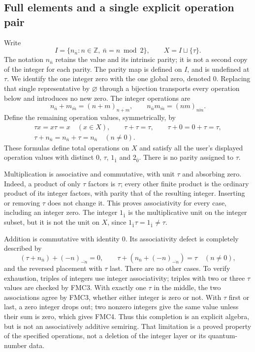 \subsection{Full elements and a single explicit operation pair}
Write
\begin{equation}\tag{FMC1}
I=\{n_{\bar n}:n\in\mathbb Z,\ \bar n=n\bmod2\},\qquad
X=I\sqcup\{\tau\}.
\end{equation}
The notation $n_{\bar n}$ retains the value and its intrinsic parity;
it is not a second copy of the integer for each parity. The parity
map is defined on $I$, and is undefined at $\tau$. We identify the
one integer zero with the one global zero, denoted $0$.
Replacing that single representative by $\varnothing$ through a
bijection transports every operation below and introduces no new zero.
The integer operations are
\begin{equation}\tag{FMC2}
n_{\bar n}+m_{\bar m}=(n+m)_{\overline{n+m}},\qquad
n_{\bar n}m_{\bar m}=(nm)_{\overline{nm}}.
\end{equation}
Define the remaining operation values, symmetrically, by
\begin{equation}\tag{FMC3}
\begin{gathered}
\tau x=x\tau=x\quad(x\in X),\qquad
\tau+\tau=\tau,\qquad\tau+0=0+\tau=\tau,\\
\tau+n_{\bar n}=n_{\bar n}+\tau=n_{\bar n}\quad(n\ne0).
\end{gathered}
\end{equation}
These formulas define total operations on $X$ and satisfy all the
user's displayed operation values with distinct $0$, $\tau$,
$1_{\bar1}$ and $2_{\bar0}$. There is no parity assigned to $\tau$.

Multiplication is associative and commutative, with unit $\tau$
and absorbing zero. Indeed, a product of only $\tau$ factors is
$\tau$; every other finite product is the ordinary product of its
integer factors, with parity that of the resulting integer.
Inserting or removing $\tau$ does not change it. This proves
associativity for every case, including an integer zero.
The integer $1_{\bar1}$ is the multiplicative unit on the integer
subset, but it is not the unit on $X$, since
$1_{\bar1}\tau=1_{\bar1}\ne\tau$.

Addition is commutative with identity $0$. Its associativity defect
is completely described by
\begin{equation}\tag{FMC4}
(\tau+n_{\bar n})+(-n)_{\overline{-n}}=0,\qquad
\tau+(n_{\bar n}+(-n)_{\overline{-n}})=\tau\quad(n\ne0),
\end{equation}
and the reversed placement with $\tau$ last. There are no other
cases. To verify exhaustion, triples of integers use integer
associativity; triples with two or three $\tau$ values are checked
by FMC3. With exactly one $\tau$ in the middle, the two associations
agree by FMC3, whether either integer is zero or not. With $\tau$
first or last, a zero integer drops out; two nonzero integers give
the same value unless their sum is zero, which gives FMC4.
Thus this completion is an explicit algebra, but is not an
associatively additive semiring. That limitation is a proved
property of the specified operations, not a deletion of the integer
layer or its quantum-number data.

